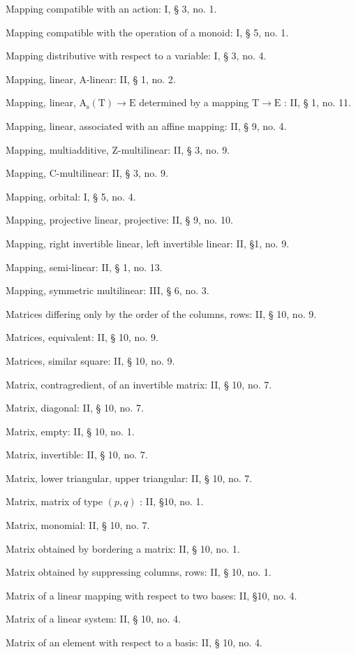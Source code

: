 Mapping compatible with an action: I, § 3, no. 1.

Mapping compatible with the operation of a monoid: I, § 5, no. 1.

Mapping distributive with respect to a variable: I, § 3, no. 4.

Mapping, linear, A-linear: II, § 1, no. 2.

Mapping, linear, \(\mathrm{A_s(T)} \to \mathrm{E}\) determined by a mapping \(\mathrm{T} \to \mathrm{E}\) : II, § 1, no. 11.

Mapping, linear, associated with an affine mapping: II, § 9, no. 4.

Mapping, multiadditive, Z-multilinear: II, § 3, no. 9.

Mapping, C-multilinear: II, § 3, no. 9.

Mapping, orbital: I, § 5, no. 4.

Mapping, projective linear, projective: II, § 9, no. 10.

Mapping, right invertible linear, left invertible linear: II, §1, no. 9.

Mapping, semi-linear: II, § 1, no. 13.

Mapping, symmetric multilinear: III, § 6, no. 3.

Matrices differing only by the order of the columns, rows: II, § 10, no. 9.

Matrices, equivalent: II, § 10, no. 9.

Matrices, similar square: II, § 10, no. 9.

Matrix, contragredient, of an invertible matrix: II, § 10, no. 7.

Matrix, diagonal: II, § 10, no. 7.

Matrix, empty: II, § 10, no. 1.

Matrix, invertible: II, § 10, no. 7.

Matrix, lower triangular, upper triangular: II, § 10, no. 7.

Matrix, matrix of type \((p,q)\) : II, §10, no. 1.

Matrix, monomial: II, § 10, no. 7.

Matrix obtained by bordering a matrix: II, § 10, no. 1.

Matrix obtained by suppressing columns, rows: II, § 10, no. 1.

Matrix of a linear mapping with respect to two bases: II, §10, no. 4.

Matrix of a linear system: II, § 10, no. 4.

Matrix of an element with respect to a basis: II, § 10, no. 4.

